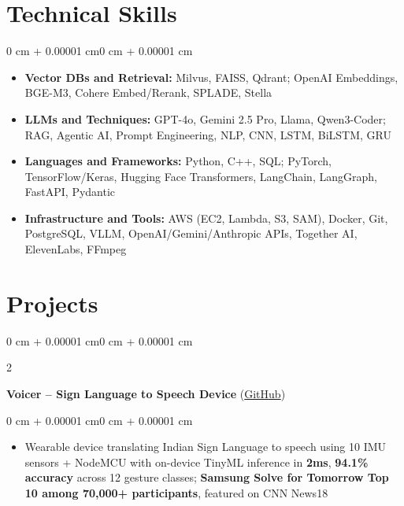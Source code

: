 \documentclass[10pt, letterpaper]{article}
\newenvironment{highlights}{
    \begin{itemize}[
        topsep=0.01 cm,
        parsep=0.01 cm,
        partopsep=0pt,
        itemsep=0pt,
        leftmargin=0 cm + 10pt
    ]
}{
    \end{itemize}
}
\newenvironment{highlightsforbulletentries}{
    \begin{itemize}[
        topsep=0.01 cm,
        parsep=0.01 cm,
        partopsep=0pt,
        itemsep=0pt,
        leftmargin=10pt
    ]
}{
    \end{itemize}
}
\newenvironment{onecolentry}{
    \begin{adjustwidth}{0 cm + 0.00001 cm}{0 cm + 0.00001 cm}
}{
    \end{adjustwidth}
}
\newenvironment{twocolentry}[2][]{
    \onecolentry
    \def\secondColumn{#2}
    \setcolumnwidth{\fill, 5.5 cm}
    \begin{paracol}{2}
}{
    \switchcolumn \raggedleft \secondColumn
    \end{paracol}
    \endonecolentry
}
\let\hrefWithoutArrow\href
\begin{document}
    \section{Technical Skills}

    \begin{onecolentry}
        \begin{highlightsforbulletentries}
            \item \textbf{Vector DBs and Retrieval:} Milvus, FAISS, Qdrant; OpenAI Embeddings, BGE-M3, Cohere Embed/Rerank, SPLADE, Stella
            \item \textbf{LLMs and Techniques:} GPT-4o, Gemini 2.5 Pro, Llama, Qwen3-Coder; RAG, Agentic AI, Prompt Engineering, NLP, CNN, LSTM, BiLSTM, GRU
            \item \textbf{Languages and Frameworks:} Python, C++, SQL; PyTorch, TensorFlow/Keras, Hugging Face Transformers, LangChain, LangGraph, FastAPI, Pydantic
            \item \textbf{Infrastructure and Tools:} AWS (EC2, Lambda, S3, SAM), Docker, Git, PostgreSQL, VLLM, OpenAI/Gemini/Anthropic APIs, Together AI, ElevenLabs, FFmpeg
        \end{highlightsforbulletentries}
    \end{onecolentry}

    \section{Projects}

        \begin{twocolentry}{
            2023
        }
            \textbf{Voicer -- Sign Language to Speech Device} (\hrefWithoutArrow{https://github.com/amit-gohel/voicer}{GitHub})
        \end{twocolentry}

        \vspace{0.02 cm}
        \begin{onecolentry}
            \begin{highlights}
                \item Wearable device translating Indian Sign Language to speech using 10 IMU sensors + NodeMCU with on-device TinyML inference in \textbf{2ms}, \textbf{94.1\% accuracy} across 12 gesture classes; \textbf{Samsung Solve for Tomorrow Top 10 among 70,000+ participants}, featured on CNN News18
            \end{highlights}
        \end{onecolentry}
\end{document}
